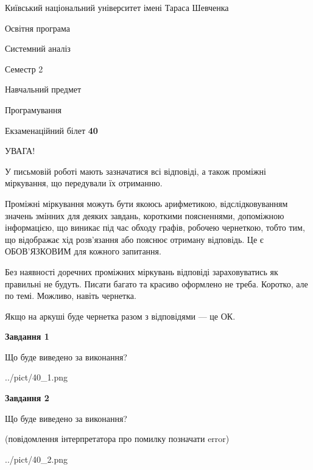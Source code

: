 \documentclass[12pt, ukrainian]{article}
\begin{document}
{{\begin {small}\par
{ \center  Київський національний університет імені Тараса Шевченка \par}
{\parbox {5 cm}{Освітня програма \hfill}{\parbox {7 cm}{Системний аналіз \hfill}}\parbox {6 cm}{\hfill Семестр 2}}\par
{\parbox {5 cm} {Навчальний предмет \hfill}\parbox {7 cm}{Програмування \hfill}\parbox {6cm}{\hfill}\par}\vspace{-7pt} \end{small}}{\center Екзаменаційний білет \No \textbf
{ 40 }\par}}
{
\begin {large}
УВАГА!

У письмовій роботі мають зазначатися всі відповіді, а також проміжні міркування, що передували їх отриманню.

Проміжні міркування можуть бути якоюсь арифметикою, відслідковуванням зна\-чень змінних для деяких завдань,
короткими поясненнями, допоміжною інформацією, що виникає під час обходу графів, робочею чернеткою,
тобто тим, що відображає хід розв’язання або пояснює отриману відповідь.
Це є ОБОВ’ЯЗКОВИМ для кожного запитання.

Без наявності доречних проміжних міркувань відповіді зараховуватись як правиль\-ні не будуть.
Писати багато та красиво оформлено не треба. Коротко, але по темі. Можли\-во, навіть чернетка.

Якщо на аркуші буде чернетка разом з відповідями --- це ОК.

\newpage

{\begin {center}\textbf{Завдання 1}\end {center}}\par
Що буде виведено за виконання?\par
\begin{center}
	{../pict/40_1.png}
\end{center}
\newpage

{\begin {center}\textbf{Завдання 2}\end {center}}\par
Що буде виведено за виконання?\par
 (повідомлення інтерпретатора про помилку позначати error)\par
\begin{center}
	{../pict/40_2.png}
\end{center}
\newpage


\end{large}}
\end{document}
